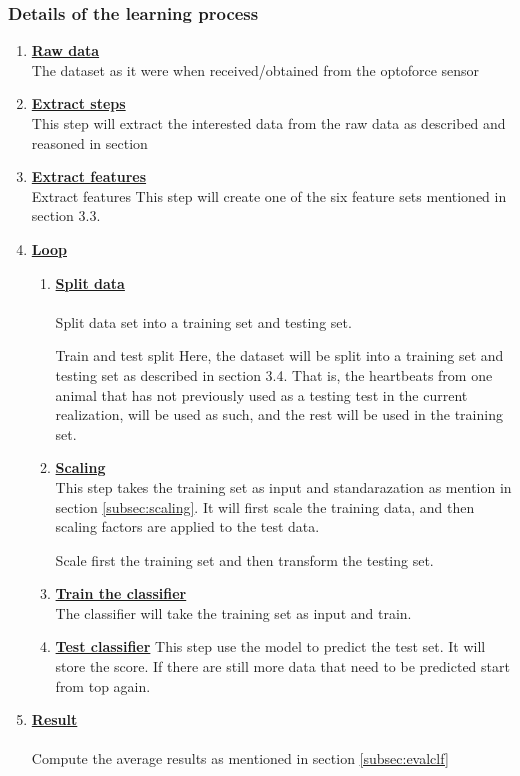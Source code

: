 \documentclass[USenglish]{ifimaster}  %
\begin{document}
\subsubsection{Details of the learning process}
\begin{enumerate}
\item \textbf{\underline{Raw data}}
\\
The dataset as it were when received/obtained from the optoforce sensor

\item \textbf{\underline{Extract steps}}
\\
This step will extract the interested data from the raw data as described and reasoned in section

\item \textbf{\underline{Extract features}}
\\
Extract features This step will create one of the six feature sets
mentioned in section 3.3.

\item \textbf{\underline{Loop}}

\begin{enumerate}
\item \textbf{\underline{Split data}} 
\\
\\
Split data set into a training set and testing set.

Train and test split Here, the dataset will be split into a training
set and testing set as described in section 3.4. That is, the
heartbeats from one animal that has not previously used as a
testing test in the current realization, will be used as such, and
the rest will be used in the training set.
\item \textbf{\underline{Scaling}}
\\
This step takes the training set as input and standarazation as mention in section \ref{subsec:scaling}. It will first scale the training data, and then scaling factors are applied to the test data.

Scale first the training set and then transform the testing set.
\item \textbf{\underline{Train the classifier}}
\\
The classifier will take the training set as input and train.

\item \textbf{\underline{Test classifier}} This step use the model to predict the test set. It will store the score. If there are still more data that need to be predicted start from top again.
\end{enumerate}

\item \textbf{\underline{Result}}
\\
\\
Compute the average results as mentioned in section \ref{subsec:evalclf} 
\end{enumerate}
\end{document}
